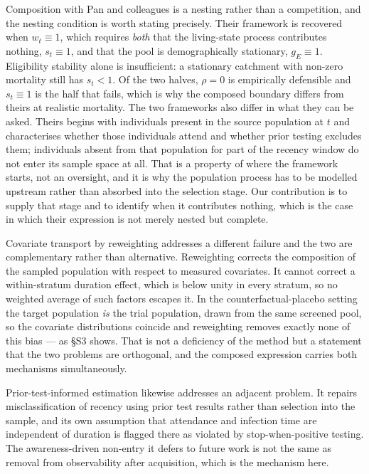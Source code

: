 Composition with Pan and colleagues is a nesting rather than a competition, and the nesting condition is worth stating precisely. Their framework is recovered when \(w_t\equiv1\), which requires \emph{both} that the living-state process contributes nothing, \(s_t\equiv1\), and that the pool is demographically stationary, \(g_E\equiv1\). Eligibility stability alone is insufficient: a stationary catchment with non-zero mortality still has \(s_t<1\). Of the two halves, \(\rho=0\) is empirically defensible and \(s_t\equiv1\) is the half that fails, which is why the composed boundary differs from theirs at realistic mortality. The two frameworks also differ in what they can be asked. Theirs begins with individuals present in the source population at \(t\) and characterises whether those individuals attend and whether prior testing excludes them; individuals absent from that population for part of the recency window do not enter its sample space at all. That is a property of where the framework starts, not an oversight, and it is why the population process has to be modelled upstream rather than absorbed into the selection stage. Our contribution is to supply that stage and to identify when it contributes nothing, which is the case in which their expression is not merely nested but complete.

Covariate transport by reweighting addresses a different failure and the two are complementary rather than alternative. Reweighting corrects the composition of the sampled population with respect to measured covariates. It cannot correct a within-stratum duration effect, which is below unity in every stratum, so no weighted average of such factors escapes it. In the counterfactual-placebo setting the target population \emph{is} the trial population, drawn from the same screened pool, so the covariate distributions coincide and reweighting removes exactly none of this bias --- as §S3 shows. That is not a deficiency of the method but a statement that the two problems are orthogonal, and the composed expression carries both mechanisms simultaneously.

Prior-test-informed estimation likewise addresses an adjacent problem. It repairs misclassification of recency using prior test results rather than selection into the sample, and its own assumption that attendance and infection time are independent of duration is flagged there as violated by stop-when-positive testing. The awareness-driven non-entry it defers to future work is not the same as removal from observability after acquisition, which is the mechanism here.

